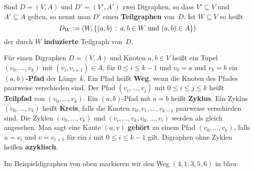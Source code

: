 \begin{defn}
Sind $D=(V,A)$ und $D'=(V',A')$ zwei Digraphen, so dass $V' \subseteq V$ und $A' \subseteq A$ gelten, so nennt man $D'$ einen \textbf{Teilgraphen} von~$D$.
Ist $W \subseteq V$ so heißt
\[
D_{W} := \left( W, \left\{ (a,b) \,:\, a,b \in W \text{ und } (a,b) \in A \right\} \right)
\]
der durch $W$ \textbf{induzierte} Teilgraph von~$D$.
\end{defn}

\begin{defn} 
Für einen Digraphen $D=(V,A)$ und Knoten $a,b \in V$ heißt ein Tupel $(v_0,\ldots,v_k)$ mit $(v_i,v_{i+1}) \in A$, für $0 \leq i \leq k-1$ und $v_0=a$ und $v_k=b$ ein \textbf{$(a,b)$-Pfad} der Länge~$k$.
Ein Pfad heißt \textbf{Weg}, wenn die Knoten des Pfades paarweise verschieden sind.
Der Pfad $(v_i,\ldots,v_j)$ mit $0 \le i \le j \le k$ heißt \textbf{Teilpfad} von $(v_0,\ldots,v_k)$.
Ein $(a,b)$-Pfad mit $a=b$ heißt \textbf{Zyklus}.
Ein Zyklus $(v_0,\ldots,v_k)$ heißt \textbf{Kreis}, falls die Knoten $v_0,v_1,\ldots,v_{k-1}$ paarweise verschieden sind.
Die Zyklen $(v_0,\ldots,v_k)$ und $(v_i,\ldots,v_k,v_0,\ldots,v_i)$ werden als gleich angesehen.
Man sagt eine Kante $(u,v)$ \textbf{gehört} zu einem Pfad $(v_0,\ldots,v_k)$, falls $u=v_i$ und $v=v_{i+1}$ für ein $i$ mit $0 \le i \leq k-1$ gilt.
Digraphen ohne Zyklen heißen \textbf{azyklisch}.
\end{defn} 


\begin{bsp} 
Im Beispieldigraphen von oben markieren wir den Weg $(4,1,3,5,6)$ in blau:

\begin{center}
\end{center}
\end{bsp} 

